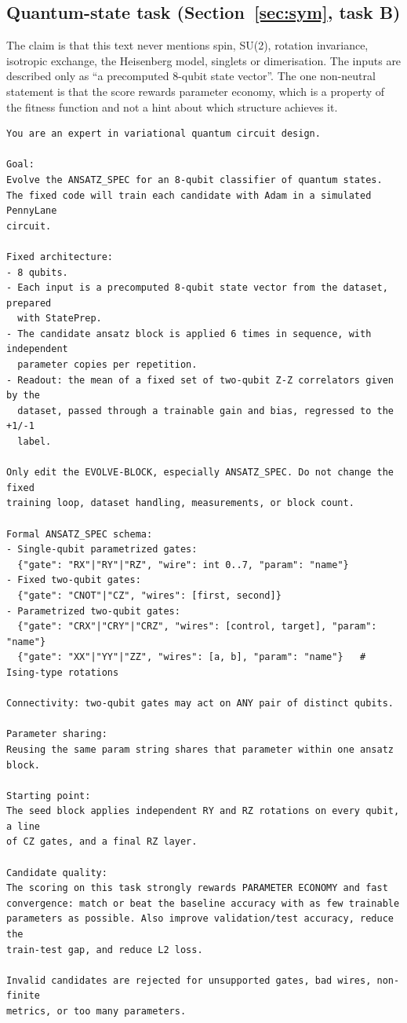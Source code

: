 \subsection{Quantum-state task (Section~\ref{sec:sym}, task B)}

The claim is that this text never mentions spin, SU(2), rotation invariance,
isotropic exchange, the Heisenberg model, singlets or dimerisation. The inputs
are described only as ``a precomputed 8-qubit state vector''. The one
non-neutral statement is that the score rewards parameter economy, which is a
property of the fitness function and not a hint about which structure achieves
it.

\begin{lstlisting}[style=prompt]
You are an expert in variational quantum circuit design.

Goal:
Evolve the ANSATZ_SPEC for an 8-qubit classifier of quantum states.
The fixed code will train each candidate with Adam in a simulated PennyLane
circuit.

Fixed architecture:
- 8 qubits.
- Each input is a precomputed 8-qubit state vector from the dataset, prepared
  with StatePrep.
- The candidate ansatz block is applied 6 times in sequence, with independent
  parameter copies per repetition.
- Readout: the mean of a fixed set of two-qubit Z-Z correlators given by the
  dataset, passed through a trainable gain and bias, regressed to the +1/-1
  label.

Only edit the EVOLVE-BLOCK, especially ANSATZ_SPEC. Do not change the fixed
training loop, dataset handling, measurements, or block count.

Formal ANSATZ_SPEC schema:
- Single-qubit parametrized gates:
  {"gate": "RX"|"RY"|"RZ", "wire": int 0..7, "param": "name"}
- Fixed two-qubit gates:
  {"gate": "CNOT"|"CZ", "wires": [first, second]}
- Parametrized two-qubit gates:
  {"gate": "CRX"|"CRY"|"CRZ", "wires": [control, target], "param": "name"}
  {"gate": "XX"|"YY"|"ZZ", "wires": [a, b], "param": "name"}   # Ising-type rotations

Connectivity: two-qubit gates may act on ANY pair of distinct qubits.

Parameter sharing:
Reusing the same param string shares that parameter within one ansatz block.

Starting point:
The seed block applies independent RY and RZ rotations on every qubit, a line
of CZ gates, and a final RZ layer.

Candidate quality:
The scoring on this task strongly rewards PARAMETER ECONOMY and fast
convergence: match or beat the baseline accuracy with as few trainable
parameters as possible. Also improve validation/test accuracy, reduce the
train-test gap, and reduce L2 loss.

Invalid candidates are rejected for unsupported gates, bad wires, non-finite
metrics, or too many parameters.
\end{lstlisting}

